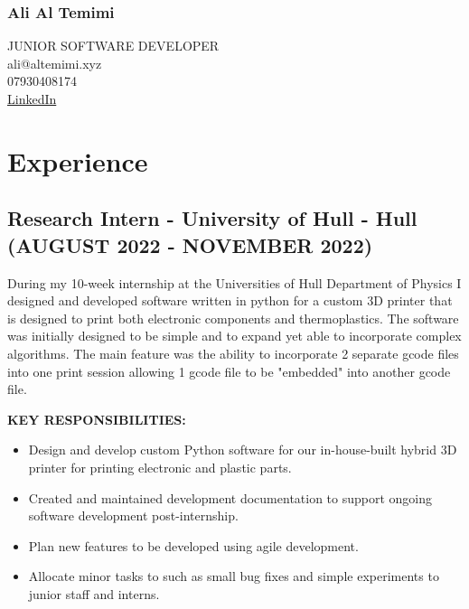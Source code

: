 \documentclass{article}
\begin{document}
\begin{multicols}{2}
    \subsubsection{Ali Al Temimi}
    \raggedright\small JUNIOR SOFTWARE DEVELOPER\\
    \columnbreak
    \Large\raggedleft ali@altemimi.xyz \\ 07930408174 \\ \href{https://www.linkedin.com/in/ali-al-temimi-8995b4196/}{LinkedIn}
    \noindent
\end{multicols}

\section{Experience}
\subsection{Research Intern - \textnormal{University of Hull - Hull} \footnotesize{(AUGUST 2022 - NOVEMBER 2022)}}
During my 10-week internship at the Universities of Hull Department of Physics I designed and developed software written in python for a custom 3D printer that is designed to print both electronic components and thermoplastics. The software was initially designed to be simple and to expand yet able to incorporate complex algorithms. The main feature was the ability to incorporate 2 separate gcode files into one print session allowing 1 gcode file to be "embedded" into another gcode file. 
\vspace{0.5em}
\newline
\begin{minipage}[t]{1\textwidth}
    \footnotesize{\textbf{KEY RESPONSIBILITIES:}}
    \normalsize{}
    \begin{itemize}[leftmargin=*]
        \item Design and develop custom Python software for our in-house-built hybrid 3D printer for printing electronic and plastic parts. 
        \item Created and maintained development documentation to support ongoing software development post-internship.
        \item Plan new features to be developed using agile development.
        \item Allocate minor tasks to such as small bug fixes and simple experiments to junior staff and interns. 
    \end{itemize}
\end{minipage}
\hfill
\vspace{0.1em}
\end{document}
